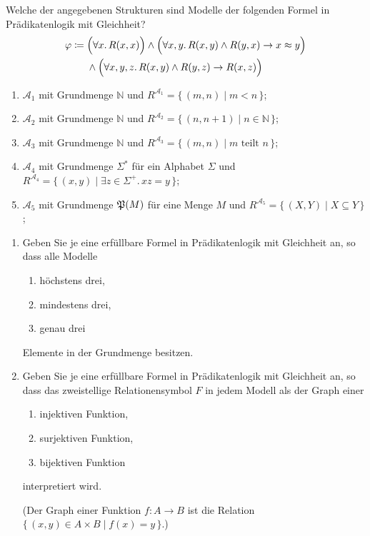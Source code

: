 \documentclass[german]{latteachCD}[2017/03/28]
\begin{document}
\clearpage

\setcounter{exercise}{0}

\begin{exercise}
  Welche der angegebenen Strukturen sind Modelle der folgenden Formel in
  Prädikatenlogik mit Gleichheit?
  \begin{align*}
    \phi \coloneqq{}
    & \Bigl(\forall x.\, R(x,x)\Bigr) \land \Bigl(\forall x, y.\, R(x,y) \land
      R(y,x) \to x \approx y\Bigr)\\
    &\land \Bigl(\forall x, y, z.\, R(x,y) \land R(y,z) \to R(x,z)\Bigr)
  \end{align*}
  \begin{enumerate}
  \item $\mathcal{A}_{1}$ mit Grundmenge $\mathbb N$ und $R^{\mathcal{A}_{1}} =
    \{\,(m,n) \mid m < n \,\}$;
  \item $\mathcal{A}_{2}$ mit Grundmenge $\mathbb N$ und $R^{\mathcal{A}_{2}} =
    \{\,(n,n+1) \mid n \in \mathbb N \,\}$;
  \item $\mathcal{A}_{3}$ mit Grundmenge $\mathbb N$ und $R^{\mathcal{A}_{3}} =
    \{\,(m,n) \mid m \text{ teilt } n\,\}$;
  \item $\mathcal{A}_{4}$ mit Grundmenge $\Sigma^{*}$ für ein Alphabet $\Sigma$
    und $R^{\mathcal{A}_{4}} = \{\,(x,y) \mid \exists z \in \Sigma^{+}\!.\, xz =
    y\,\}$;
  \item $\mathcal{A}_{5}$ mit Grundmenge $\subsets{M}$ für eine Menge $M$ und
    $R^{\mathcal{A}_{5}} = \{\,(X,Y) \mid X \subseteq Y\,\}$;
  \end{enumerate}
\end{exercise}

\begin{exercise}
  \begin{enumerate}
  \item Geben Sie je eine erfüllbare Formel in Prädikatenlogik mit Gleichheit
    an, so dass alle Modelle
    \begin{enumerate}
    \item höchstens drei,
    \item mindestens drei,
    \item genau drei
    \end{enumerate}
    Elemente in der Grundmenge besitzen.
  \item Geben Sie je eine erfüllbare Formel in Prädikatenlogik mit Gleichheit
    an, so dass das zweistellige Relationensymbol $F$ in jedem Modell als der
    Graph einer
    \begin{enumerate}
    \item injektiven Funktion,
    \item surjektiven Funktion,
    \item bijektiven Funktion
    \end{enumerate}
    interpretiert wird.

    (Der Graph einer Funktion $f \colon A \to B$ ist die Relation $\{\,(x,y) \in
    A \times B \mid f(x) = y\,\}$.)
  \end{enumerate}
\end{exercise}
\end{document}
